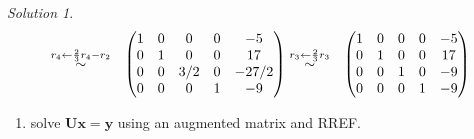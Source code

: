 \documentclass[
]{book}
\providecommand{\tightlist}{%
  \setlength{\itemsep}{0pt}\setlength{\parskip}{0pt}}
\theoremstyle{definition}
\theoremstyle{definition}
\theoremstyle{definition}
\theoremstyle{remark}
\newtheorem*{solution}{Solution}
\begin{document}
\begin{solution}
\[\begin{aligned}
& \stackrel{r_4 \leftarrow \frac{2}{3} r_4 - r_2}{\huge \sim} & \begin{pmatrix} 1 & 0 & 0 & 0 & -5 \\ 0 & 1 & 0 & 0 & 17 \\ 0 & 0 & 3/2 & 0 & -27/2 \\ 0 & 0 & 0 & 1 & -9 \end{pmatrix} & \stackrel{r_3 \leftarrow \frac{2}{3} r_3}{\huge \sim} & \begin{pmatrix} 1 & 0 & 0 & 0 & -5 \\ 0 & 1 & 0 & 0 & 17 \\ 0 & 0 & 1 & 0 & -9 \\ 0 & 0 & 0 & 1 & -9 \end{pmatrix}
\end{aligned}
\]

\begin{enumerate}
\def\labelenumi{\arabic{enumi})}
\setcounter{enumi}{1}
\tightlist
\item
  solve \(\mathbf{U} \mathbf{x} = \mathbf{y}\) using an augmented matrix and RREF.
\end{enumerate}


\end{solution}
\end{document}
